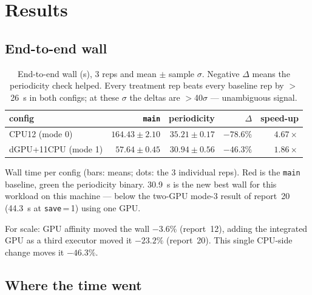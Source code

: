 \documentclass[
	english,
	letterpaper, oneside
]{article}
\begin{document}
\section{Results}
\label{sec:results}

\subsection{End-to-end wall}

\begin{table}[H]
\centering
\caption{End-to-end wall (s), 3 reps and mean $\pm$ sample $\sigma$. Negative
$\Delta$ means the periodicity check helped. Every treatment rep beats
every baseline rep by $>$26~s in both configs; at these $\sigma$ the deltas
are $>$40$\sigma$ --- unambiguous signal.\label{tab:wall}}
\begin{tabular}{lrrrr}
\toprule
config & \texttt{main} & periodicity & $\Delta$ & speed-up \\
\midrule
CPU12 (mode 0)      & $164.43 \pm 2.10$ & $35.21 \pm 0.17$ & $-78.6\%$ & $4.67\times$ \\
dGPU+11CPU (mode 1) & $57.64 \pm 0.45$  & $30.94 \pm 0.56$ & $-46.3\%$ & $1.86\times$ \\
\bottomrule
\end{tabular}
\end{table}

            {Wall time per config (bars: means; dots: the 3 individual reps).
             Red is the \texttt{main} baseline, green the periodicity binary.
             30.9~s is the new best wall for this workload on this machine ---
             below the two-GPU mode-3 result of report~20 (44.3~s at
             \texttt{save}\,=\,1) using one GPU. \label{fig:wall}}

For scale: GPU affinity moved the wall $-3.6\%$ (report~12), adding the
integrated GPU as a third executor moved it $-23.2\%$ (report~20). This single
CPU-side change moves it $-46.3\%$.

\subsection{Where the time went}
\end{document}
